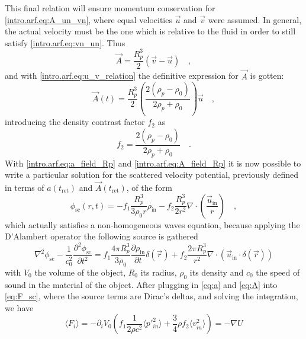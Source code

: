 This final relation will ensure momentum conservation for \eqref{intro.arf.eq:A_un_vn}, where equal velocities $\vec u$ and $\vec v$ were assumed. In general, the actual velocity must be the one which is relative to the fluid in order to still satisfy \eqref{intro.arf.eq:vn_un}. Thus
\begin{equation}
    \vec A = \frac{R_p^3}{2}(\vec v - \vec u)\quad,
\end{equation}
and with \eqref{intro.arf.eq:u_v_relation} the definitive expression for $\vec A$ is gotten:
\begin{equation}\label{intro.arf.eq:A_field_Rp}
    \vec A(t) = \frac{R_p^3}{2}\left(\frac{2(\rho_p-\rho_0)}{2\rho_p+\rho_0}\right)\vec u\quad,
\end{equation}
introducing the density contrast factor $f_2$ as
\begin{equation}
    f_2 = \frac{2(\rho_p-\rho_0)}{2\rho_p+\rho_0}\quad.
\end{equation}
With \eqref{intro.arf.eq:a_field_Rp} and \eqref{intro.arf.eq:A_field_Rp} it is now possible to write a particular solution for the scattered velocity potential, previously defined in terms of $a(t_{\text{ret}})$ and $\vec A(t_{\text{ret}})$, of the form
\begin{equation}
    \phi_{\text{sc}}(r,t) = -f_1\frac{R_p^3}{3\rho_0 r}\dot{\rho_{\text{in}}} - f_2\frac{R_p^3}{2r^2}\nabla\cdot\left(\frac{\vec u_{\text{in}}}{r}\right)\quad,
\end{equation}
which actually satisfies a non-homogeneous waves equation, because applying the D'Alambert operator the following source is gathered
\begin{equation}
    \nabla^2\phi_{\text{sc}} - \frac{1}{c_0^2}\frac{\partial^2\phi_{\text{sc}}}{\partial t^2} = f_1\frac{4\pi R_p^3}{3\rho_0}\frac{\partial\rho_{\text{in}}}{\partial t}\delta(\vec r) + f_2\frac{2\pi R_p^3}{r^2}\nabla\cdot\left(\vec u_{\text{in}}\cdot\delta(\vec r)\right)
\end{equation}
with $V_0$ the volume of the object, $R_0$ its radius, $\rho_0$ its density and $c_0$ the speed of sound in the material of the object. After plugging in \eqref{eq:a} and \eqref{eq:A} into \eqref{eq:F_sc}, where the source terms are Dirac's deltas, and solving the integration, we have
\begin{equation}\label{eq:F_grad_U}
    \langle F_i \rangle = -\partial_i V_0\left(f_1\frac{1}{2\rho c^2}\langle p'^2_{in} \rangle + \frac{3}{4}\rho f_2\langle v^2_{in} \rangle\right) = -\nabla U
\end{equation}
